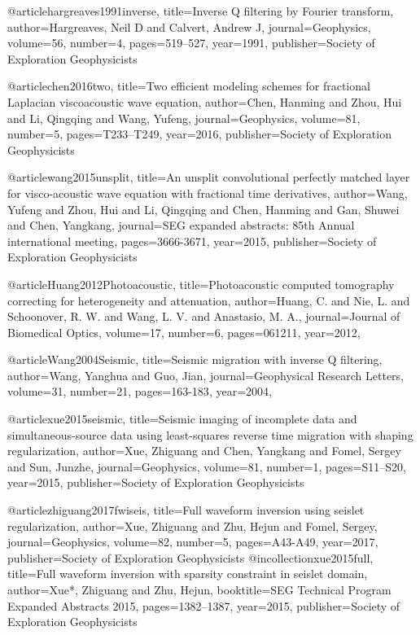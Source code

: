 {@article{hargreaves1991inverse,
  title={Inverse {Q} filtering by Fourier transform},
  author={Hargreaves, Neil D and Calvert, Andrew J},
  journal={Geophysics},
  volume={56},
  number={4},
  pages={519--527},
  year={1991},
  publisher={Society of Exploration Geophysicists}
}

@article{chen2016two,
  title={Two efficient modeling schemes for fractional {L}aplacian viscoacoustic wave equation},
  author={Chen, Hanming and Zhou, Hui and Li, Qingqing and Wang, Yufeng},
  journal={Geophysics},
  volume={81},
  number={5},
  pages={T233--T249},
  year={2016},
  publisher={Society of Exploration Geophysicists}
}

@article{wang2015unsplit,
  title={An unsplit convolutional perfectly matched layer for visco-acoustic wave equation with fractional time derivatives},
  author={Wang, Yufeng and Zhou, Hui and Li, Qingqing and Chen, Hanming and Gan, Shuwei and Chen, Yangkang},
  journal={SEG expanded abstracts: 85th Annual international meeting},
  pages={3666-3671},
  year={2015},
  publisher={Society of Exploration Geophysicists}
}

@article{Huang2012Photoacoustic,
  title={Photoacoustic computed tomography correcting for heterogeneity and attenuation},
  author={Huang, C. and Nie, L. and Schoonover, R. W. and Wang, L. V. and Anastasio, M. A.},
  journal={Journal of Biomedical Optics},
  volume={17},
  number={6},
  pages={061211},
  year={2012},
}

@article{Wang2004Seismic,
  title={Seismic migration with inverse {Q} filtering},
  author={Wang, Yanghua and Guo, Jian},
  journal={Geophysical Research Letters},
  volume={31},
  number={21},
  pages={163-183},
  year={2004},
}

@article{xue2015seismic,
  title={Seismic imaging of incomplete data and simultaneous-source data using least-squares reverse time migration with shaping regularization},
  author={Xue, Zhiguang and Chen, Yangkang and Fomel, Sergey and Sun, Junzhe},
  journal={Geophysics},
  volume={81},
  number={1},
  pages={S11--S20},
  year={2015},
  publisher={Society of Exploration Geophysicists}
}

@article{zhiguang2017fwiseis,
  title={Full waveform inversion using seislet regularization},
  author={Xue, Zhiguang and Zhu, Hejun and Fomel, Sergey},
  journal={Geophysics},
  volume={82},
  number={5},
  pages={A43-A49},
  year={2017},
  publisher={Society of Exploration Geophysicists}
}
@incollection{xue2015full,
  title={Full waveform inversion with sparsity constraint in seislet domain},
  author={Xue*, Zhiguang and Zhu, Hejun},
  booktitle={SEG Technical Program Expanded Abstracts 2015},
  pages={1382--1387},
  year={2015},
  publisher={Society of Exploration Geophysicists}
}


}
